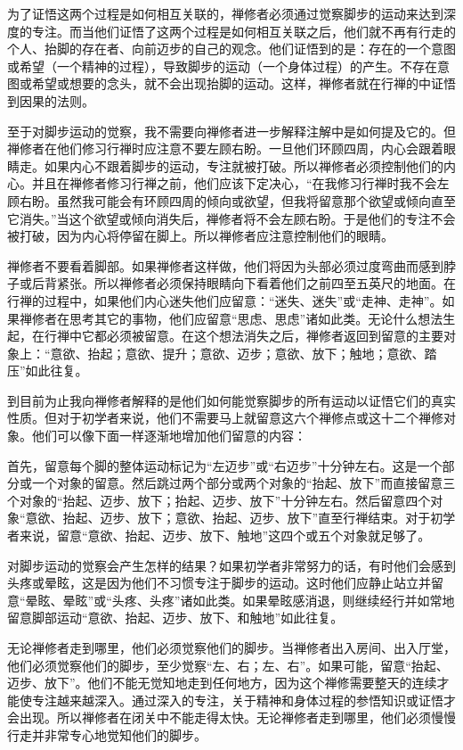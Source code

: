 为了证悟这两个过程是如何相互关联的，禅修者必须通过觉察脚步的运动来达到深度的专注。而当他们\1证悟了这两个过程是如何相互关联之后，他们就不再有行走的个人、抬脚的存在者、向前迈步的自己的观念。他们证悟到的是：存在的一个意图或希望（一个精神的过程），导致脚步的运动（一个身体过程）的产生。不存在意图或希望或想要的念头，就不会出现抬脚的运动。这样，禅修者就在行禅的中证悟到因果的法则。

至于对脚步运动的觉察，我不需要向禅修者进一步解释注解中是如何提及它的。但禅修者在他们修习行禅时应注意不要左顾右盼。一旦他们环顾四周，内心会跟着眼睛走。如果内心不跟着脚步的运动，专注就被打破。所以禅修者必须控制他们的内心。并且在禅修者修习行禅之前，他们应该下定决心，“在我修习行禅时我不会左顾右盼。虽然我可能会有环顾四周的倾向或欲望，但我将留意那个欲望或倾向直至它消失。”当这个欲望或倾向消失后，禅修者将不会左顾右盼。于是他们的专注不会被打破，因为内心将停留在脚上。所以禅修者应注意控制他们的眼睛。

禅修者不要看着脚部。如果禅修者这样做，他们将因为头部必须过度弯曲而感到脖子或后背紧张。所以禅修者必须保持眼睛向下看着他们之前四至五英尺的地面。在行禅的过程中，如果他们内心迷失他们应留意：“迷失、迷失”或“走神、走神”。如果禅修者在思考其它的事物，他们应留意“思虑、思虑”诸如此类。无论什么想法生起，在行禅中它都必须被留意。在这个想法消失之后，禅修者返回到留意的主要对象上：“意欲、\1抬起；意欲、提升；意欲、迈步；意欲、放下；触地；意欲、踏压”如此往复。

到目前为止我向禅修者解释的是他们如何能觉察脚步的所有运动以证悟它们的真实性质。但对于初学者来说，他们不需要马上就留意这六个禅修点或这十二个禅修对象。他们可以像下面一样逐渐地增加他们留意的内容：

首先，留意每个脚的整体运动标记为“左迈步”或“右迈步”十分钟左右。这是一个部分或一个对象的留意。然后跳过两个部分或两个对象的“抬起、放下”而直接留意三个对象的“抬起、迈步、放下；抬起、迈步、放下”十分钟左右。然后留意四个对象“意欲、抬起、迈步、放下；意欲、抬起、迈步、放下”直至行禅结束。对于初学者来说，留意“意欲、抬起、迈步、放下、触地”这四个或五个对象就足够了。

对脚步运动的觉察会产生怎样的结果？如果初学者非常努力的话，有时他们会感到头疼或晕眩，这是因为他们不习惯专注于脚步的运动。这时他们应静止站立并留意“晕眩、晕眩”或“头疼、头疼”诸如此类。如果晕眩感消退，则继续经行并如常地留意脚部运动“意欲、抬起、迈步、放下、和触地”如此往复。

无论禅修者走到哪里，他们必须觉察他们的脚步。当禅修者出入房间、出入厅堂，他们必须觉察他们的脚步，至少觉察“左、右；左、右”。如果可能，\1留意“抬起、迈步、放下”。他们不能无觉知地走到任何地方，因为这个禅修需要整天的连续才能使专注越来越深入。通过深入的专注，关于精神和身体过程的参悟知识或证悟才会出现。所以禅修者在闭关中不能走得太快。无论禅修者走到哪里，他们必须慢慢行走并非常专心地觉知他们的脚步。

